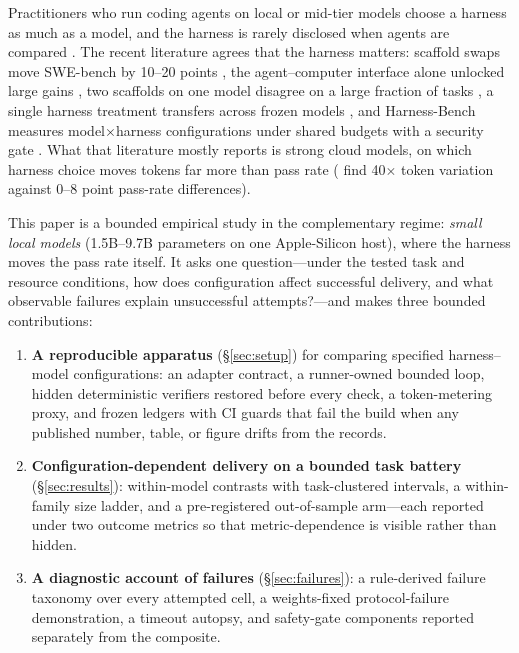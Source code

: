\documentclass[10pt]{article}
\begin{document}
Practitioners who run coding agents on local or mid-tier models choose a harness as much as a
model, and the harness is rarely disclosed when agents are compared
\citep{stopcomparing,scaffoldeffect}. The recent literature agrees that the harness matters:
scaffold swaps move SWE-bench by 10--20 points \citep{swebench,epoch2024benchmarking}, the
agent--computer interface alone unlocked large gains \citep{sweagent}, two scaffolds on one model
disagree on a large fraction of tasks \citep{hal}, a single harness treatment transfers across
frozen models \citep{samemodel}, and Harness-Bench measures model$\times$harness configurations
under shared budgets with a security gate \citep{harnessbench}. What that literature mostly
reports is strong cloud models, on which harness choice moves tokens far more than pass rate
(\citet{scaffoldeffect} find 40$\times$ token variation against 0--8 point pass-rate differences).

This paper is a bounded empirical study in the complementary regime: \emph{small local models}
(1.5B--9.7B parameters on one Apple-Silicon host), where the harness moves the pass rate itself.
It asks one question---under the tested task and resource conditions, how does configuration
affect successful delivery, and what observable failures explain unsuccessful attempts?---and
makes three bounded contributions:

\begin{enumerate}
\item \textbf{A reproducible apparatus} (\S\ref{sec:setup}) for comparing specified
  harness--model configurations: an adapter contract, a runner-owned bounded loop, hidden
  deterministic verifiers restored before every check, a token-metering proxy, and frozen
  ledgers with CI guards that fail the build when any published number, table, or figure
  drifts from the records.
\item \textbf{Configuration-dependent delivery on a bounded task battery}
  (\S\ref{sec:results}): within-model contrasts with task-clustered intervals, a within-family
  size ladder, and a pre-registered out-of-sample arm---each reported under two outcome metrics
  so that metric-dependence is visible rather than hidden.
\item \textbf{A diagnostic account of failures} (\S\ref{sec:failures}): a rule-derived failure
  taxonomy over every attempted cell, a weights-fixed protocol-failure demonstration, a timeout
  autopsy, and safety-gate components reported separately from the composite.
\end{enumerate}
\end{document}
